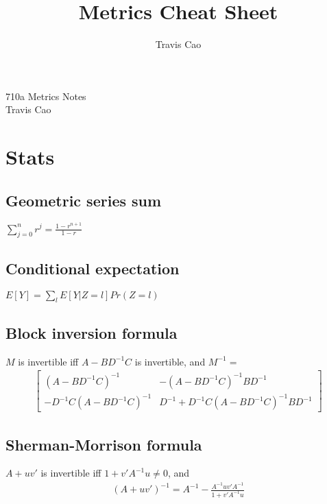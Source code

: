 \documentclass[10pt,landscape]{article}
\title{Metrics Cheat Sheet}
\author{Travis Cao}
\begin{document}
\raggedright
\footnotesize
\begin{multicols}{3}

\setlength{\premulticols}{1pt}
\setlength{\postmulticols}{1pt}
\setlength{\multicolsep}{1pt}
\setlength{\columnsep}{2pt}


\begin{center}
    \large{710a Metrics Notes} \\
    \vspace{.1cm}
    \normalsize{Travis Cao}
\end{center}

\vspace{-.8cm}

\section{Stats}

\subsection{Geometric series sum}
$\sum_{j = 0}^n r^j = \frac{1 - r^{n+1}}{1 - r}$

\subsection{Conditional expectation}
$E[Y] = \sum_l E[Y|Z = l] Pr(Z = l)$

\subsection{Block inversion formula}
$M$ is invertible iff $A-BD^{-1}C$ is invertible, and $M^{-1} = $
\begin{align*}
  \begin{bmatrix}
    (A-BD^{-1}C)^{-1} & -(A-BD^{-1}C)^{-1}BD^{-1} \\ 
    -D^{-1}C(A-BD^{-1}C)^{-1} & D^{-1}+D^{-1}C(A-BD^{-1}C)^{-1}BD^{-1}
  \end{bmatrix}
\end{align*}

\subsection{Sherman-Morrison formula}
$A+uv'$ is invertible iff $1+v'A^{-1}u \neq 0$, and
\begin{align*}
  (A+uv')^{-1} = A^{-1} - \frac{A^{-1}uv'A^{-1}}{1+v'A^{-1}u}
\end{align*}


\end{multicols}
\end{document}
